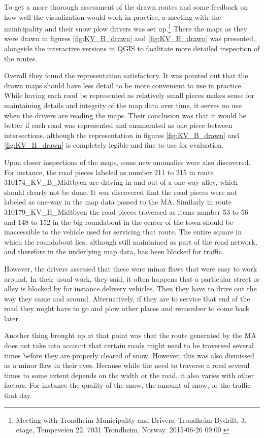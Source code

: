 To get a more thorough assessment of the drawn routes and some feedback on how well the visualization would work in practice, a meeting with the municipality and their snow plow drivers was set up.\footnote{Meeting with Trondheim Municipality and Drivers. Trondheim Bydrift, 3. etage, Tempeveien 22, 7031 Trondheim, Norway. 2015-06-26 09:00.} There the maps as they were drawn in figures \ref{fig:KV_B_drawn} and \ref{fig:KV_H_drawn} was presented, alongside the interactive versions in QGIS to facilitate more detailed inspection of the routes.

Overall they found the representation satisfactory. It was pointed out that the drawn maps should have less detail to be more convenient to use in practice. While having each road be represented as relatively small pieces makes sense for maintaining details and integrity of the map data over time, it serves no use when the drivers are reading the maps. Their conclusion was that it would be better if each road was represented and enumerated as one piece between intersections, although the representation in figures \ref{fig:KV_B_drawn} and \ref{fig:KV_H_drawn} is completely legible and fine to use for evaluation.

Upon closer inspections of the maps, some new anomalies were also discovered. For instance, the road pieces labeled as number 211 to 215 in route 310174\_KV\_B\_Midtbyen are driving in and out of a one-way alley, which should clearly not be done. It was discovered that the road pieces were not labeled as one-way in the map data passed to the MA. Similarly in route 310179\_KV\_H\_Midtbyen the road pieces traversed as items number 53 to 56 and 148 to 152 in the big roundabout in the center of the town should be inaccessible to the vehicle used for servicing that route. The entire square in which the roundabout lies, although still maintained as part of the road network, and therefore in the underlying map data, has been blocked for traffic.

However, the drivers assessed that these were minor flaws that were easy to work around. In their usual work, they said, it often happens that a particular street or alley is blocked by for instance delivery vehicles. Then they have to drive out the way they came and around. Alternatively, if they are to service that end of the road they might have to go and plow other places and remember to come back later.

Another thing brought up at that point was that the route generated by the MA does not take into account that certain roads might need to be traversed several times before they are properly cleared of snow. However, this was also dismissed as a minor flaw in their eyes. Because while the need to traverse a road several times to some extent depends on the width or the road, it also varies with other factors. For instance the quality of the snow, the amount of snow, or the traffic that day.

